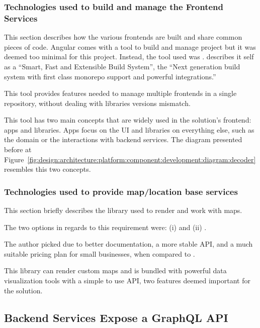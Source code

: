 \subsubsection{Technologies used to build and manage the Frontend Services}
\label{subsubsec:implementation:decisions:frontend:nx}

This section describes how the various frontends are built and share common pieces of code. Angular comes with a tool to build and manage project but it was deemed too minimal for this project. Instead, the tool used was .  describes it self as a ``Smart, Fast and Extensible Build System'', the
``Next generation build system with first class monorepo support and powerful integrations.''

This tool provides features needed to manage multiple frontends in a single repository, without dealing with libraries versions mismatch.

This tool has two main concepts that are widely used in the solution's frontend: apps and libraries. Apps focus on the \gls{UI} and libraries on everything else, such as the domain or the interactions with backend services. The diagram presented before at Figure~\ref{fig:design:architecture:platform:component:development:diagram:decoder} resembles this two concepts.

\subsubsection{Technologies used to provide map/location base services}
\label{subsubsec:implementation:decisions:frontend:maps}

This section briefly describes the library used to render and work with maps.

The two options in regards to this requirement were: (i)  and (ii) .

The author picked  due to better documentation, a more stable \gls{API}, and a much suitable pricing plan for small businesses, when compared to .

This library can render custom maps and is bundled with powerful data visualization tools with a simple to use \gls{API}, two features deemed important for the solution.

\subsection{Backend Services Expose a GraphQL API}
\label{subsec:implementation:decisions:graphql}

